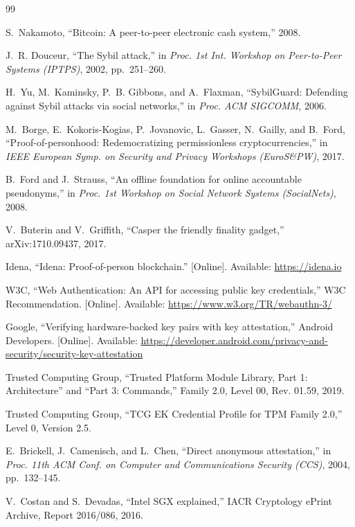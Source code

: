 \documentclass[conference,10pt]{IEEEtran}
\begin{document}
\begin{thebibliography}{99}

S.~Nakamoto, ``Bitcoin: A peer-to-peer electronic cash system,'' 2008.

J.~R. Douceur, ``The Sybil attack,'' in \emph{Proc. 1st Int. Workshop on Peer-to-Peer Systems
(IPTPS)}, 2002, pp.~251--260.

H.~Yu, M.~Kaminsky, P.~B. Gibbons, and A.~Flaxman, ``SybilGuard: Defending against Sybil
attacks via social networks,'' in \emph{Proc. ACM SIGCOMM}, 2006.

M.~Borge, E.~Kokoris-Kogias, P.~Jovanovic, L.~Gasser, N.~Gailly, and B.~Ford,
``Proof-of-personhood: Redemocratizing permissionless cryptocurrencies,'' in \emph{IEEE
European Symp. on Security and Privacy Workshops (EuroS\&PW)}, 2017.

B.~Ford and J.~Strauss, ``An offline foundation for online accountable pseudonyms,'' in
\emph{Proc. 1st Workshop on Social Network Systems (SocialNets)}, 2008.

V.~Buterin and V.~Griffith, ``Casper the friendly finality gadget,'' arXiv:1710.09437, 2017.

Idena, ``Idena: Proof-of-person blockchain.'' [Online]. Available: \url{https://idena.io}

W3C, ``Web Authentication: An API for accessing public key credentials,'' W3C Recommendation.
[Online]. Available: \url{https://www.w3.org/TR/webauthn-3/}

Google, ``Verifying hardware-backed key pairs with key attestation,'' Android Developers.
[Online]. Available:
\url{https://developer.android.com/privacy-and-security/security-key-attestation}

Trusted Computing Group, ``Trusted Platform Module Library, Part 1: Architecture'' and
``Part 3: Commands,'' Family 2.0, Level 00, Rev. 01.59, 2019.

Trusted Computing Group, ``TCG EK Credential Profile for TPM Family 2.0,'' Level 0, Version
2.5.

E.~Brickell, J.~Camenisch, and L.~Chen, ``Direct anonymous attestation,'' in \emph{Proc. 11th
ACM Conf. on Computer and Communications Security (CCS)}, 2004, pp.~132--145.

V.~Costan and S.~Devadas, ``Intel SGX explained,'' IACR Cryptology ePrint Archive, Report
2016/086, 2016.


\end{thebibliography}
\end{document}
